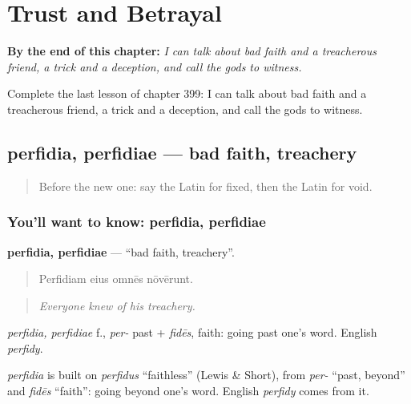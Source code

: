 
\chapter{Trust and Betrayal}
\label{ch:la-trust-and-betrayal}

\begin{chapteropening}
\textbf{By the end of this chapter:} \emph{I can talk about bad faith and a treacherous friend, a trick and a deception, and call the gods to witness.}

Complete the last lesson of chapter 399: I can talk about bad faith and a treacherous friend, a trick and a deception, and call the gods to witness.
\end{chapteropening}

\section[perfidia, perfidiae]{perfidia, perfidiae — bad faith, treachery}

\label{lesson:LA-C399-perfidia}



\begin{quote}
Before the new one: say the Latin for fixed, then the Latin for void.
\end{quote}

\subsection*{You'll want to know: perfidia, perfidiae}
\textbf{perfidia, perfidiae} — \textquotedblleft{}bad faith, treachery\textquotedblright{}.

\begin{quote}
Perfidiam eius omnēs nōvērunt.
\end{quote}

\begin{quote}
\emph{Everyone knew of his treachery.}
\end{quote}

\emph{perfidia, perfidiae} f., \emph{per-} past + \emph{fidēs}, faith: going past one's word. English \emph{perfidy}.

\begin{cousinweb}
\emph{perfidia} is built on \emph{perfidus} \textquotedblleft{}faithless\textquotedblright{} (Lewis \& Short), from \emph{per-} \textquotedblleft{}past, beyond\textquotedblright{} and \emph{fidēs} \textquotedblleft{}faith\textquotedblright{}: going beyond one's word. English \emph{perfidy} comes from it.
\end{cousinweb}

